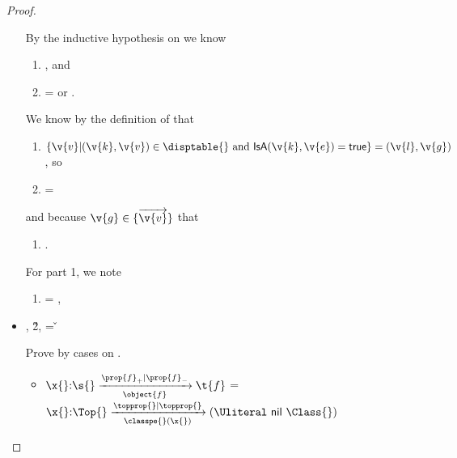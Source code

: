 \begin{lemma}
\begin{proof}
\begin{case}[T-App]
\begin{itemize}
\begin{subcase}[B-BetaMulti]
  By the inductive hypothesis on  we know 
  \begin{enumerate}[resume]
    \item {}, and
    \item {} = \emptyobject{} or .
  \end{enumerate}

  We know by the definition of \getmethodliteral that
  \begin{enumerate}[resume]
    \item $\{ \v{v} | {\roundpair{\v{k}}{\v{v}}} \in \disptable{} \text{ and } \isaopsem{\v{k}}{\v{e}} = {\true{}} \} = {\roundpair{\v{l}}{\v{g}}}$, so
    \item {} = {\true{}}
  \end{enumerate}

  and because ${\v{g}} \in \{\overrightarrow{\v{v}}\}$
  that 
  \begin{enumerate}[resume]
    \item
  {}.
  \end{enumerate}

  For part 1, we note
  \begin{enumerate}[resume]
    \item
  \object{} = {
                           {}
                           {\x{}}},
  \end{enumerate}

\end{subcase}
  \item[]
\begin{subcase}[B-Delta]
  \opsem {\openv{}} {} {\const{}},
  \opsem {\openv{}} {} {\v{2}},
   = \v{}


  Prove by cases on \const{}.
  \begin{itemize}
    \item[] \begin{subcase}[\const{} = \classconst]
    ${\ArrowOne {\x{}} {\s{}}
                                                       {\t{f}}
                                                       {\filterset {\thenprop {\prop{f}}}
                                                                   {\elseprop {\prop{f}}}}
                                                       {\object{f}}}$
                                                       =
  ${\ArrowOne {\x{}} {\Top{}}
                                      {\Union{\nil{}}{\Class{}}}
                                      {\filterset {\topprop{}}
                                                  {\topprop{}}}
                                      {\path {\classpe{}} {\x{}}}}$


\end{subcase}
\end{itemize}
\end{subcase}
\end{itemize}
\end{case}
\end{proof}
\end{lemma}
